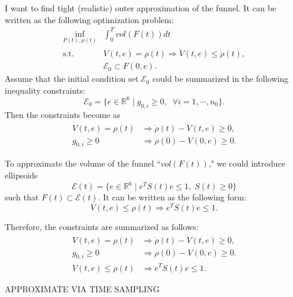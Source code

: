 \documentclass{article}
\begin{document}
I want to find tight (realistic) outer approximation of the funnel.
It can be written as the following optimization problem:
\begin{equation}
\begin{array}{ll}
\inf_{P(t),\rho(t)} &\displaystyle \int_0^T vol(F(t))dt \\ 
\text{s.t.} & V(t,e) = \rho(t) \Longrightarrow \dot{V}(t,e) \leq \dot{\rho}(t), \\
            & \mathcal{E}_0 \subset F(0,e). 
\end{array} \nonumber
\end{equation}
Assume that the initial condition set $\mathcal{E}_0$ could be summarized in the following inequality constraints:
\begin{equation}
\mathcal{E}_0 = \{e\in\mathbb{R}^6 \;|\; g_{0,i} \geq 0, \;\;\forall i = 1,\cdots,n_0\}.
\nonumber
\end{equation}
Then the constraints become as
\begin{align}
V(t,e) = \rho(t) &\Longrightarrow  \dot{\rho}(t) - \dot{V}(t,e) \geq 0, \nonumber\\
g_{0,i} \geq 0 &\Longrightarrow \rho(0) - V(0,e) \geq 0.  \nonumber 
\end{align}

To approximate the volume of the funnel ``$vol(F(t))$," we could introduce ellipsoids 
\begin{equation}
\mathcal{E}(t) = \{e \in \mathbb{R}^6 \;|\; e^T S(t) e \leq 1,\; S(t) \geq 0\}
\nonumber
\end{equation}  
such that $F(t) \subset \mathcal{E}(t)$. It can be written as the following form:
\begin{equation}
V(t,e) \leq \rho(t) \Longrightarrow e^TS(t)e \leq 1. \nonumber
\end{equation}

Therefore, the constraints are summarized as follows:
\begin{align}
V(t,e) = \rho(t) &\Longrightarrow  \dot{\rho}(t) - \dot{V}(t,e) \geq 0, \nonumber \\
g_{0,i} \geq 0 &\Longrightarrow \rho(0) - V(0,e) \geq 0.  \nonumber \\ 
V(t,e) \leq \rho(t) &\Longrightarrow e^TS(t)e \leq 1. \nonumber
\end{align}

APPROXIMATE VIA TIME SAMPLING
\end{document}
